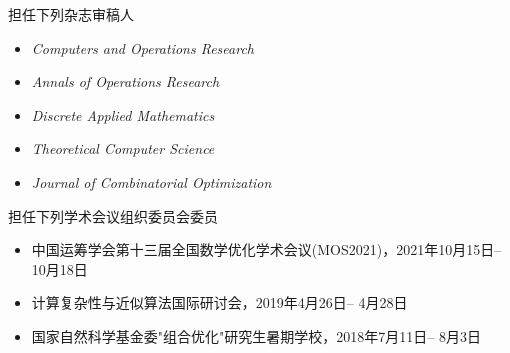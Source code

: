 %
%


{
\fontsize{9.65pt}{\baselineskip}\selectfont
担任下列杂志审稿人
\begin{itemize}[leftmargin=*]
	\item \emph{Computers and Operations Research}
	\item \emph{Annals of Operations Research}
	\item \emph{Discrete Applied Mathematics}
	\item \emph{Theoretical Computer Science}
	\item \emph{Journal of Combinatorial Optimization}
\end{itemize}

担任下列学术会议组织委员会委员
\begin{itemize}[leftmargin=*]
	\item 中国运筹学会第十三届全国数学优化学术会议(MOS2021)，2021年10月15日-- 10月18日
	\item 计算复杂性与近似算法国际研讨会，2019年4月26日-- 4月28日
	\item 国家自然科学基金委"组合优化"研究生暑期学校，2018年7月11日-- 8月3日
\end{itemize}


}
